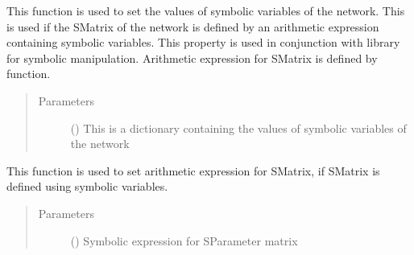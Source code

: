 \documentclass[letterpaper,10pt,english]{sphinxmanual}
\begin{document}
\begin{fulllineitems}

\begin{fulllineitems}
\label{\detokenize{touchstone:touchstone.spfile.set_sym_parameters}}
This function is used to set the values of symbolic variables of the network. This is used if the S\sphinxhyphen{}Matrix of the network is defined by an arithmetic expression containing symbolic variables. This property is used in conjunction with  library for symbolic manipulation. Arithmetic expression for S\sphinxhyphen{}Matrix is defined by  function.
\begin{quote}\begin{description}
\item[{Parameters}] \leavevmode
{} () \textendash{} This is a dictionary containing the values of symbolic variables of the network

\end{description}\end{quote}

\end{fulllineitems}


\begin{fulllineitems}
\label{\detokenize{touchstone:touchstone.spfile.set_sym_smatrix}}
This function is used to set arithmetic expression for S\sphinxhyphen{}Matrix, if S\sphinxhyphen{}Matrix is defined using symbolic variables.
\begin{quote}\begin{description}
\item[{Parameters}] \leavevmode
{} () \textendash{} Symbolic  expression for S\sphinxhyphen{}Parameter matrix

\end{description}\end{quote}


\end{fulllineitems}
\end{fulllineitems}
\end{document}
